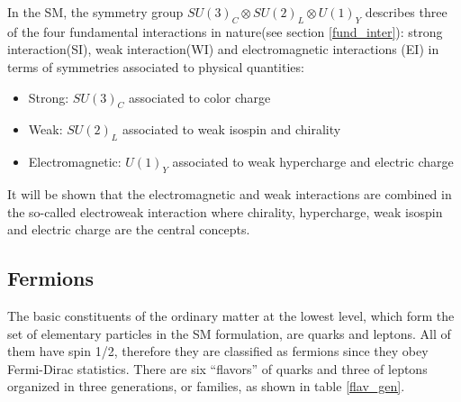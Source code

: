 \noindent In the SM, the symmetry group $SU(3)_C\otimes SU(2)_L\otimes U(1)_Y$ describes three of the four fundamental interactions in nature(see section \ref{fund_inter}): strong interaction(SI), weak interaction(WI) and electromagnetic interactions (EI) in terms of symmetries associated to physical quantities:
\begin{itemize}
\item Strong: $SU(3)_C$ associated to color charge
\item Weak: $SU(2)_L$ associated to weak isospin and chirality
\item Electromagnetic: $U(1)_Y$ associated to weak hypercharge and electric charge
\end{itemize}

\noindent It will be shown that the electromagnetic and weak interactions are combined in the so-called electroweak interaction where chirality, hypercharge, weak isospin and electric charge are the central concepts.

\subsection{Fermions}\label{fermions}

\noindent The basic constituents of the ordinary matter at the lowest level, which form the set of elementary particles in the SM formulation, are quarks and leptons. All of them have spin 1/2, therefore they are classified as fermions since they obey Fermi-Dirac statistics. There are six ``flavors'' of quarks and three of leptons organized in three generations, or families, as shown in table \ref{flav_gen}.\\


